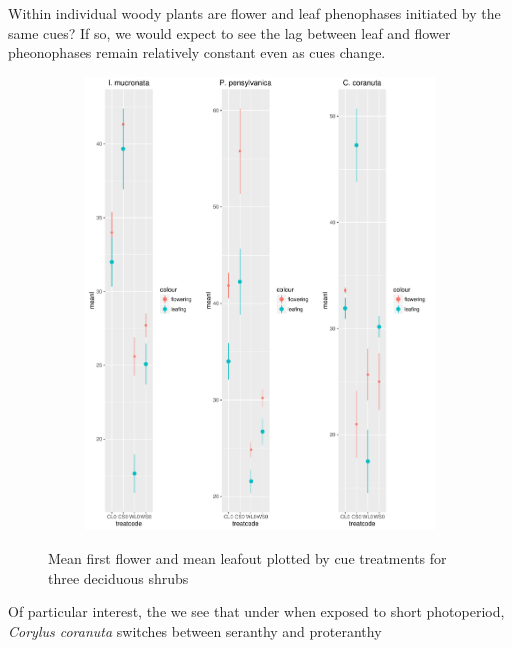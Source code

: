 \documentclass{article}
\begin{document}

Within individual woody plants are flower and leaf phenophases initiated by the same cues? If so, we would expect to see the lag between leaf and flower pheonophases remain relatively constant even as cues change. 

\begin{figure}[h!]

\includegraphics[width=15cm, height=12cm]{shrubs_sidebyside.pdf}\\
\caption{Mean first flower and mean leafout plotted by cue treatments for three deciduous shrubs}
\end{figure}
Of particular interest, the we see that under when exposed to short photoperiod, \textit{Corylus coranuta} switches between seranthy and proteranthy
\end{document}
